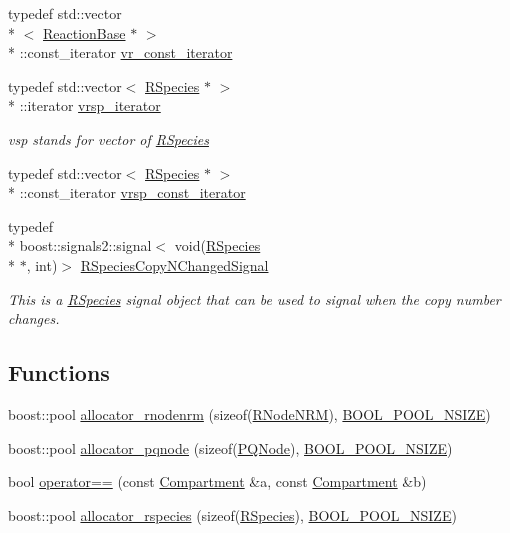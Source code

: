 \begin{DoxyCompactItemize}
typedef std\-::vector\\*
$<$ \hyperlink{classchem_1_1ReactionBase}{Reaction\-Base} $\ast$ $>$\\*
\-::const\-\_\-iterator \hyperlink{namespacechem_a37ac14ea0688e0f1bc93f320f1240a74}{vr\-\_\-const\-\_\-iterator}
\item 
typedef std\-::vector$<$ \hyperlink{classchem_1_1RSpecies}{R\-Species} $\ast$ $>$\\*
\-::iterator \hyperlink{namespacechem_a9b02b32d43473a3cd87fd30f910cc121}{vrsp\-\_\-iterator}
\begin{DoxyCompactList}\small\item\em vsp stands for vector of \hyperlink{classchem_1_1RSpecies}{R\-Species} \end{DoxyCompactList}\item 
typedef std\-::vector$<$ \hyperlink{classchem_1_1RSpecies}{R\-Species} $\ast$ $>$\\*
\-::const\-\_\-iterator \hyperlink{namespacechem_ab6ba36c9953625b15ff4105e1cdfdb86}{vrsp\-\_\-const\-\_\-iterator}
\item 
typedef \\*
boost\-::signals2\-::signal$<$ void(\hyperlink{classchem_1_1RSpecies}{R\-Species} \\*
$\ast$, int)$>$ \hyperlink{namespacechem_a6cb4144586460e7b7ae0dffdf08eb57c}{R\-Species\-Copy\-N\-Changed\-Signal}
\begin{DoxyCompactList}\small\item\em This is a \hyperlink{classchem_1_1RSpecies}{R\-Species} signal object that can be used to signal when the copy number changes. \end{DoxyCompactList}\end{DoxyCompactItemize}
\subsection*{Functions}
\begin{DoxyCompactItemize}
\item 
boost\-::pool \hyperlink{namespacechem_aec019986de5e2ab9597f9633542378ff}{allocator\-\_\-rnodenrm} (sizeof(\hyperlink{classchem_1_1RNodeNRM}{R\-Node\-N\-R\-M}), \hyperlink{common_8h_a8584922303a6a83690f6091592285a7f}{B\-O\-O\-L\-\_\-\-P\-O\-O\-L\-\_\-\-N\-S\-I\-Z\-E})
\item 
boost\-::pool \hyperlink{namespacechem_abe2d133c73c179db82d2cf8266a16e3a}{allocator\-\_\-pqnode} (sizeof(\hyperlink{classchem_1_1PQNode}{P\-Q\-Node}), \hyperlink{common_8h_a8584922303a6a83690f6091592285a7f}{B\-O\-O\-L\-\_\-\-P\-O\-O\-L\-\_\-\-N\-S\-I\-Z\-E})
\item 
bool \hyperlink{namespacechem_a9342b2280a45cc2043074e2a618be723}{operator==} (const \hyperlink{classchem_1_1Compartment}{Compartment} \&a, const \hyperlink{classchem_1_1Compartment}{Compartment} \&b)
\item 
boost\-::pool \hyperlink{namespacechem_a34e31b7a797e903435a3be4751cd4f42}{allocator\-\_\-rspecies} (sizeof(\hyperlink{classchem_1_1RSpecies}{R\-Species}), \hyperlink{common_8h_a8584922303a6a83690f6091592285a7f}{B\-O\-O\-L\-\_\-\-P\-O\-O\-L\-\_\-\-N\-S\-I\-Z\-E})
\end{DoxyCompactItemize}
